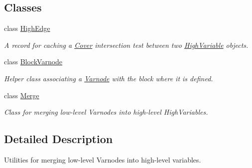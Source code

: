 \subsection*{Classes}
\begin{DoxyCompactItemize}
\item 
class \mbox{\hyperlink{class_high_edge}{High\+Edge}}
\begin{DoxyCompactList}\small\item\em A record for caching a \mbox{\hyperlink{class_cover}{Cover}} intersection test between two \mbox{\hyperlink{class_high_variable}{High\+Variable}} objects. \end{DoxyCompactList}\item 
class \mbox{\hyperlink{class_block_varnode}{Block\+Varnode}}
\begin{DoxyCompactList}\small\item\em Helper class associating a \mbox{\hyperlink{class_varnode}{Varnode}} with the block where it is defined. \end{DoxyCompactList}\item 
class \mbox{\hyperlink{class_merge}{Merge}}
\begin{DoxyCompactList}\small\item\em Class for merging low-\/level Varnodes into high-\/level High\+Variables. \end{DoxyCompactList}\end{DoxyCompactItemize}


\subsection{Detailed Description}
Utilities for merging low-\/level Varnodes into high-\/level variables. 

